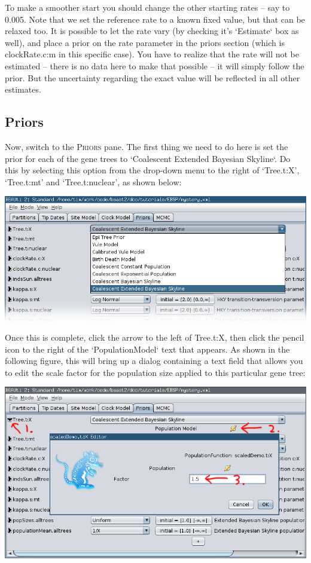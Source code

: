 \documentclass[a4paper,11pt]{article}
\begin{document}
To make a smoother start you should change the other starting rates – say to
0.005.  Note that we set the reference rate to a known fixed value, but that
can be relaxed too. It is possible to let the rate vary (by checking it's
`Estimate` box as well), and place a prior on the rate parameter in the priors
section (which is clockRate.c:m in this specific case). You have to realize
that the rate will not be estimated – there is no data here to make that
possible – it will simply follow the prior. But the uncertainty regarding the
exact value will be reflected in all other estimates.

\subsection{Priors}

Now, switch to the \textsc{Priors} pane. The first thing we need to do here is
set the prior for each of the gene trees to `Coalescent Extended Bayesian
Skyline`.  Do this by selecting this option from the drop-down menu to the
right of `Tree.t:X', `Tree.t:mt' and `Tree.t:nuclear', as shown below:

\includegraphics[width=\textwidth]{figures/tree_prior.png}

Once this is complete, click the arrow to the left of Tree.t:X, then click the
pencil icon to the right of the `PopulationModel` text that appears. As shown
in the following figure, this will bring up a dialog containing a text
field that allows you to edit the scale factor for the population size applied
to this particular gene tree:

\includegraphics[width=\textwidth]{figures/ploidy.png}
\end{document}
